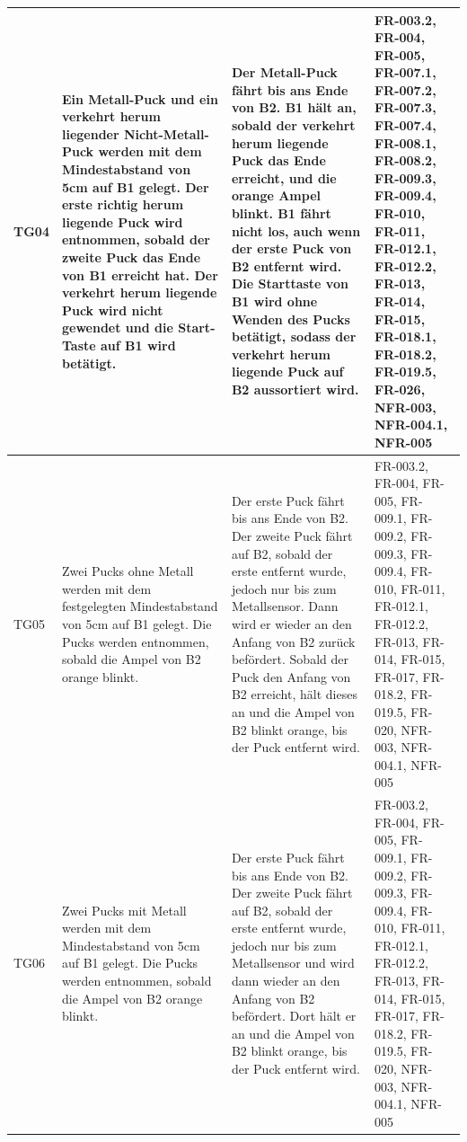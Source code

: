 \documentclass[oneside,a4paper,titlepage]{scrartcl} %
\begin{document}
\begin{small}
\begin{longtable}{|C{1.5cm}|L{4cm}|L{4.5cm}|C{3.0cm}|}
    \hline
    TG04 & Ein Metall-Puck und ein verkehrt herum liegender Nicht-Metall-Puck werden mit dem Mindestabstand von 5cm auf B1 gelegt. Der erste richtig herum liegende Puck wird entnommen, sobald der zweite Puck das Ende von B1 erreicht hat. Der verkehrt herum liegende Puck wird nicht gewendet und die Start-Taste auf B1 wird betätigt. & Der Metall-Puck fährt bis ans Ende von B2. B1 hält an, sobald der verkehrt herum liegende Puck das Ende erreicht, und die orange Ampel blinkt. B1 fährt nicht los, auch wenn der erste Puck von B2 entfernt wird. 
    Die Starttaste von B1 wird ohne Wenden des Pucks betätigt, sodass der verkehrt herum liegende Puck auf B2 aussortiert wird. & FR-003.2, FR-004, FR-005, FR-007.1, FR-007.2, FR-007.3, FR-007.4, FR-008.1, FR-008.2, FR-009.3, FR-009.4, FR-010, FR-011, FR-012.1, FR-012.2, FR-013, FR-014, FR-015, FR-018.1, FR-018.2, FR-019.5, FR-026, NFR-003, NFR-004.1, NFR-005\\
    \hline
     TG05 & Zwei Pucks ohne Metall werden mit dem festgelegten Mindestabstand von 5cm auf B1 gelegt. Die Pucks werden entnommen, sobald die Ampel von B2 orange blinkt.
     & Der erste Puck fährt bis ans Ende von B2. Der zweite Puck fährt auf B2, sobald der erste entfernt wurde, jedoch nur bis zum Metallsensor. Dann wird er wieder an den Anfang von B2 zurück befördert. Sobald der Puck den Anfang von B2 erreicht, hält dieses an und die Ampel von B2 blinkt orange, bis der Puck entfernt wird. & FR-003.2, FR-004, FR-005, FR-009.1, FR-009.2, FR-009.3, FR-009.4, FR-010, FR-011, FR-012.1, FR-012.2, FR-013, FR-014, FR-015, FR-017, FR-018.2, FR-019.5, FR-020, NFR-003, NFR-004.1, NFR-005\\
    \hline
    TG06 & Zwei Pucks mit Metall werden mit dem Mindestabstand von 5cm auf B1 gelegt. Die Pucks werden entnommen, sobald die Ampel von B2 orange blinkt. & Der erste Puck fährt bis ans Ende von B2. Der zweite Puck fährt auf B2, sobald der erste entfernt wurde, jedoch nur bis zum Metallsensor und wird dann wieder an den Anfang von B2 befördert. Dort hält er an und die Ampel von B2 blinkt orange, bis der Puck entfernt wird. & FR-003.2, FR-004, FR-005, FR-009.1, FR-009.2, FR-009.3, FR-009.4, FR-010, FR-011, FR-012.1, FR-012.2, FR-013, FR-014, FR-015, FR-017, FR-018.2, FR-019.5, FR-020, NFR-003, NFR-004.1, NFR-005\\
    \hline
  \end{longtable}
\end{small}

\newpage
\end{document}
